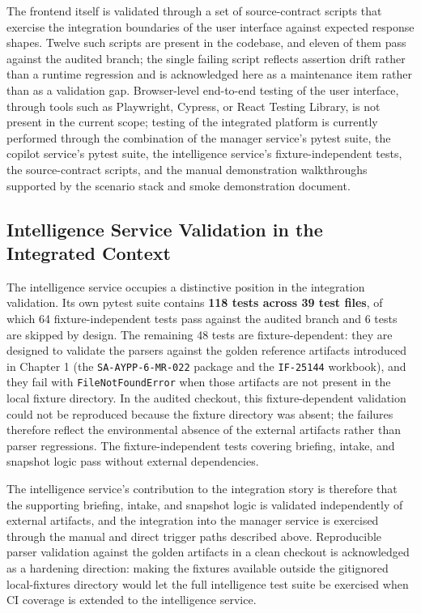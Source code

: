 The frontend itself is validated through a set of source-contract scripts that exercise the integration boundaries of the user interface against expected response shapes. Twelve such scripts are present in the codebase, and eleven of them pass against the audited branch; the single failing script reflects assertion drift rather than a runtime regression and is acknowledged here as a maintenance item rather than as a validation gap. Browser-level end-to-end testing of the user interface, through tools such as Playwright, Cypress, or React Testing Library, is not present in the current scope; testing of the integrated platform is currently performed through the combination of the manager service's pytest suite, the copilot service's pytest suite, the intelligence service's fixture-independent tests, the source-contract scripts, and the manual demonstration walkthroughs supported by the scenario stack and smoke demonstration document.

\subsection{Intelligence Service Validation in the Integrated Context}
The intelligence service occupies a distinctive position in the integration validation. Its own pytest suite contains \textbf{118 tests across 39 test files}, of which 64 fixture-independent tests pass against the audited branch and 6 tests are skipped by design. The remaining 48 tests are fixture-dependent: they are designed to validate the parsers against the golden reference artifacts introduced in Chapter 1 (the \texttt{SA-AYPP-6-MR-022} package and the \texttt{IF-25144} workbook), and they fail with \texttt{FileNotFoundError} when those artifacts are not present in the local fixture directory. In the audited checkout, this fixture-dependent validation could not be reproduced because the fixture directory was absent; the failures therefore reflect the environmental absence of the external artifacts rather than parser regressions. The fixture-independent tests covering briefing, intake, and snapshot logic pass without external dependencies.

The intelligence service's contribution to the integration story is therefore that the supporting briefing, intake, and snapshot logic is validated independently of external artifacts, and the integration into the manager service is exercised through the manual and direct trigger paths described above. Reproducible parser validation against the golden artifacts in a clean checkout is acknowledged as a hardening direction: making the fixtures available outside the gitignored local-fixtures directory would let the full intelligence test suite be exercised when CI coverage is extended to the intelligence service.

